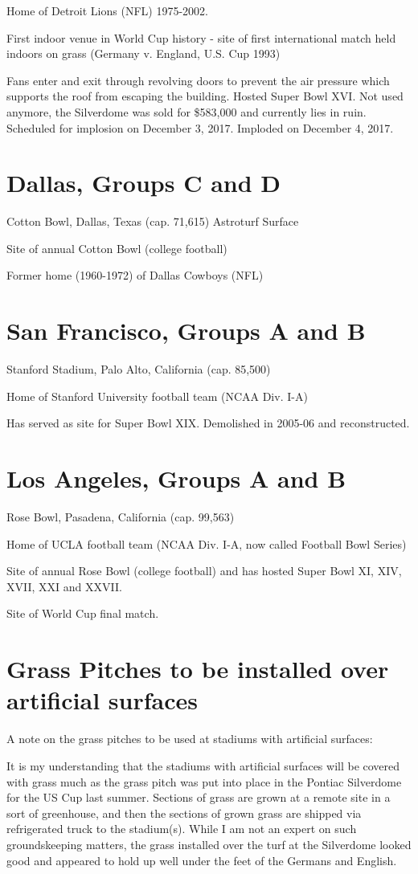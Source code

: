Home of Detroit Lions (NFL) 1975-2002.

First indoor venue in World Cup history - site of first international match 
held indoors on grass (Germany v. England, U.S. Cup 1993)

Fans enter and exit through revolving doors to prevent the air pressure which 
supports the roof from escaping the building.  Hosted Super Bowl XVI. Not used anymore, the Silverdome was sold for \$583,000 and
currently lies in ruin.  Scheduled for implosion on December 3, 2017.  Imploded on
December 4, 2017.
\section{Dallas, Groups C and D}
Cotton Bowl, Dallas, Texas (cap. 71,615) Astroturf Surface

Site of annual Cotton Bowl (college football)

Former home (1960-1972) of Dallas Cowboys (NFL)
\section{San Francisco, Groups A and B} 
Stanford Stadium, Palo Alto, California (cap. 85,500)

Home of Stanford University football team (NCAA Div. I-A)
 
Has served as site for Super Bowl XIX.  Demolished in 2005-06 and reconstructed.
\section{Los Angeles, Groups A and B} 
Rose Bowl, Pasadena, California (cap. 99,563)

Home of UCLA football team (NCAA Div. I-A, now called Football Bowl Series)

Site of annual Rose Bowl (college football) and has hosted Super Bowl XI, XIV, XVII, XXI and XXVII.

Site of World Cup final match.
\section{Grass Pitches to be installed over artificial surfaces}
A note on the grass pitches to be used at stadiums with artificial surfaces:

It is my understanding that the stadiums with artificial surfaces will be 
covered with grass much as the grass pitch was put into place in the Pontiac 
Silverdome for the US Cup last summer.  Sections of grass are grown at a remote
site in a sort of greenhouse, and then the sections of grown grass are shipped
via refrigerated truck to the stadium(s).  While I am not an expert on such 
groundskeeping matters, the grass installed over the turf at the Silverdome 
looked good and appeared to hold up well under the feet of the Germans and 
English.  

